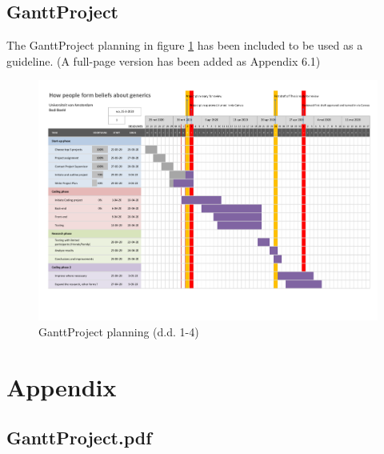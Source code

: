 \documentclass{uva-inf-article}
\begin{document}
\subsection{GanttProject}
The GanttProject planning in figure \ref{fig:planning} has been included to be used as a guideline. (A full-page version has been added as Appendix 6.1)
\begin{figure}[H]
 \centering
 \includegraphics[page=1,width=1.1\textwidth]{Gant_planning_Afstudeerproject.pdf}
 \caption{GanttProject planning (d.d. 1-4)}
 \label{fig:planning}
\end{figure}

\printbibliography

\section{Appendix}
\subsection{GanttProject.pdf}

\end{document}
